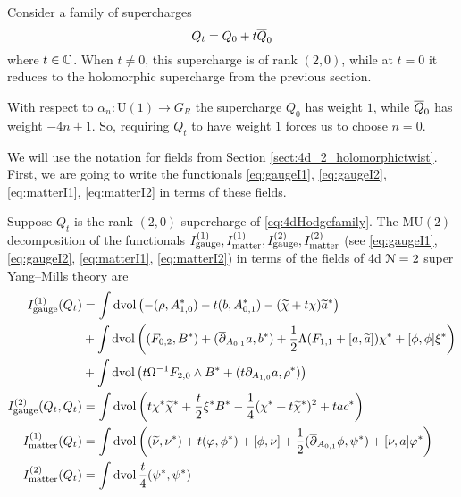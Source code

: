 \documentclass[10pt, oneside]{article}
\newcommand{\MU}{\mathrm{MU}}
\renewcommand{\U}{\mathrm{U}}
\begin{document}
Consider a family of supercharges
\begin{equation} 
\label{eq:4dHodgefamily}
Q_t = Q_0 + t \Bar{Q}_0
\end{equation}
where $t \in \CC$. When $t \ne 0$, this supercharge is of rank $(2,0)$, while at $t = 0$ it reduces to the holomorphic supercharge from the previous section.

\begin{remark}
With respect to $\alpha_n\colon \U(1)\rightarrow G_R$ the supercharge $Q_0$ has weight $1$, while $\Bar{Q}_0$ has weight $-4n+1$. So, requiring $Q_t$ to have weight $1$ forces us to choose $n=0$.
\end{remark}

We will use the notation for fields from Section \ref{sect:4d_2_holomorphictwist}. First, we are going to write the functionals \eqref{eq:gaugeI1}, \eqref{eq:gaugeI2}, \eqref{eq:matterI1}, \eqref{eq:matterI2} in terms of these fields.

\begin{prop}
\label{4d_donaldson_susy_prop}
Suppose $Q_t$ is the rank $(2,0)$ supercharge of \ref{eq:4dHodgefamily}.
The $\MU(2)$ decomposition of the functionals $I_{\rm gauge}^{(1)}, I^{(1)}_{\rm matter}, I^{(2)}_{\rm gauge}, I^{(2)}_{\rm matter}$ (see \eqref{eq:gaugeI1},  \eqref{eq:gaugeI2}, \eqref{eq:matterI1}, \eqref{eq:matterI2}) in terms of the fields of 4d $\cN=2$ super Yang--Mills theory are
\begin{align*}
I_{\rm gauge}^{(1)}(Q_t) &= \int \dvol\left(-(\rho, A_{1, 0}^*) - t(b, A_{0, 1}^*) - (\wt \chi + t\chi)\wt a^*\right) \\
& + \int\dvol\left((F_{0, 2}, B^*) + (\ol\dd_{A_{0, 1}}a, b^*) + \frac{1}{2}\Lambda(F_{1, 1}  + [a, \wt a])\chi^* + [\phi, \phi]\xi^* \right) \\
&+ \int\dvol\left( t\Omega^{-1} F_{2, 0}\wedge B^* + (t\dd_{A_{1, 0}} a, \rho^*)\right) \\
I^{(2)}_{\rm gauge} (Q_t, Q_t) &= \int \dvol \left(t\chi^*\wt \chi^* + \frac{t}{2} \xi^* B^* -\frac{1}{4}(\chi^* + t\wt\chi^*)^2 + t a c^*\right) \\
I_{\rm matter}^{(1)}(Q_t) &= \int \dvol \left((\Tilde{\nu}, \nu^*) + t (\varphi, \phi^*) + [\phi, \nu] + \frac{1}{2} (\dbar_{A_{0,1}} \phi, \psi^*) + [\nu, a]\varphi^* \right) \\
I_{\rm matter}^{(2)}(Q_t) &= \int \dvol \frac t4  (\psi^*, \psi^*)
\end{align*}
\end{prop}
\end{document}
